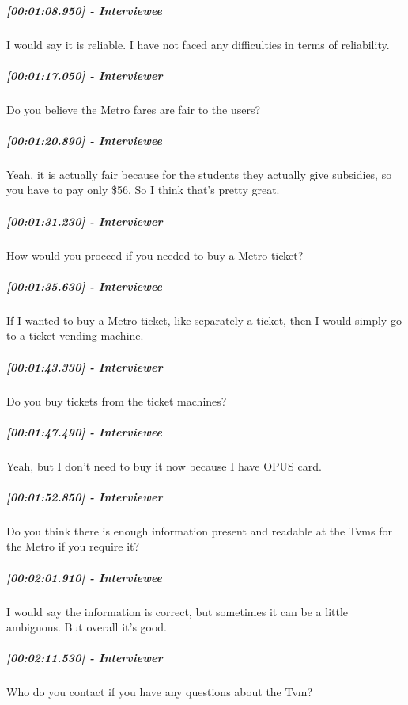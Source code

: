 \documentclass[a4paper,12pt]{article}
\begin{document}
\hypertarget{interviewee-6}{%
\subparagraph{{[}00:01:08.950{]} - Interviewee}\label{interviewee-6}}

I would say it is reliable. I have not faced any difficulties in terms
of reliability.

\hypertarget{interviewer-7}{%
\subparagraph{{[}00:01:17.050{]} - Interviewer}\label{interviewer-7}}

Do you believe the Metro fares are fair to the users?

\hypertarget{interviewee-7}{%
\subparagraph{{[}00:01:20.890{]} - Interviewee}\label{interviewee-7}}

Yeah, it is actually fair because for the students they actually give
subsidies, so you have to pay only \$56. So I think that's pretty great.

\hypertarget{interviewer-8}{%
\subparagraph{{[}00:01:31.230{]} - Interviewer}\label{interviewer-8}}

How would you proceed if you needed to buy a Metro ticket?

\hypertarget{interviewee-8}{%
\subparagraph{{[}00:01:35.630{]} - Interviewee}\label{interviewee-8}}

If I wanted to buy a Metro ticket, like separately a ticket, then I
would simply go to a ticket vending machine.

\hypertarget{interviewer-9}{%
\subparagraph{{[}00:01:43.330{]} - Interviewer}\label{interviewer-9}}

Do you buy tickets from the ticket machines?

\hypertarget{interviewee-9}{%
\subparagraph{{[}00:01:47.490{]} - Interviewee}\label{interviewee-9}}

Yeah, but I don't need to buy it now because I have OPUS card.

\hypertarget{interviewer-10}{%
\subparagraph{{[}00:01:52.850{]} - Interviewer}\label{interviewer-10}}

Do you think there is enough information present and readable at the
Tvms for the Metro if you require it?

\hypertarget{interviewee-10}{%
\subparagraph{{[}00:02:01.910{]} - Interviewee}\label{interviewee-10}}

I would say the information is correct, but sometimes it can be a little
ambiguous. But overall it's good.

\hypertarget{interviewer-11}{%
\subparagraph{{[}00:02:11.530{]} - Interviewer}\label{interviewer-11}}

Who do you contact if you have any questions about the Tvm?
\end{document}
